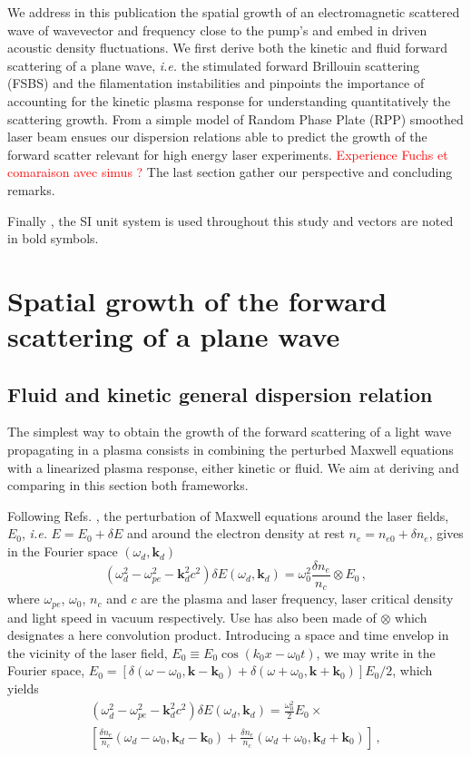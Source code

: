 \documentclass[
 reprint,
 amsmath,amssymb,
 aps,
]{revtex4-1}
\begin{document}
We address in this publication  the spatial growth of an electromagnetic scattered wave of wavevector and frequency close to the pump's and embed in driven acoustic density fluctuations.
We first derive both the kinetic and fluid forward scattering of a plane wave, \emph{i.e.} the  stimulated forward Brillouin scattering (FSBS) and the filamentation instabilities and pinpoints the importance of accounting for the kinetic plasma response for understanding quantitatively the scattering growth.
From  a simple model of Random Phase Plate (RPP) smoothed laser beam ensues our dispersion relations  able to predict the growth of the forward scatter relevant for high energy laser experiments. 
\textcolor{red}{Experience Fuchs et comaraison avec simus ?} 
The last section gather our perspective and concluding remarks. 

Finally , the SI unit system is used throughout this study and vectors are noted in bold symbols. 

\section{Spatial growth of the  forward scattering of a plane wave}\label{sec:plane}
\subsection{Fluid and kinetic general dispersion relation}
The simplest way to obtain the growth of the forward scattering of a light wave propagating in a plasma consists  in combining the perturbed Maxwell equations with a linearized plasma response, either kinetic or fluid.
We aim at deriving and comparing in this section both frameworks.

Following Refs. \cite[]{Kruer,phd_Michel}, the perturbation of Maxwell equations around the laser fields, $E_0$, \emph{i.e.} $E = E_0 + \delta E$ and around the  electron density at rest $n_e = n_{e0}+\delta n_e$, gives in the Fourier space $(\omega_d,\mathbf{k}_d)$
\begin{equation}
    (\omega_d^2 - \omega_{pe}^2 -\mathbf{k}_d^2c^2)\delta E(\omega_d,\mathbf{k}_d) = \omega_0^2 \frac{\delta n_e }{n_c}\otimes E_0  \, ,\label{eq:max1}
\end{equation}
where $\omega_{pe}$, $\omega_{0}$,  $n_c$ and $c$ are the plasma and laser frequency, laser critical density and light speed in vacuum respectively. Use has also been made of $\otimes$ which designates a here convolution product.
Introducing a space and time envelop in the vicinity of the laser field, $E_0\equiv E_0 \cos(k_0 x - \omega_0t)$,
we may write in the Fourier space,  $E_0 =[ \delta(\omega-\omega_0, \mathbf{k}-\mathbf{k}_0) + \delta(\omega+\omega_0, \mathbf{k}+\mathbf{k}_0) ]E_0/2 $, which yields 
\begin{align}
    (\omega_d^2 - \omega_{pe}^2 -\mathbf{k}_d^2c^2)\delta E(\omega_d,\mathbf{k}_d) = \frac{\omega_0^2}{2} E_0\times \nonumber\\ \left[\frac{\delta n_e }{n_c}(\omega_d-\omega_0, \mathbf{k}_d-\mathbf{k}_0) +\frac{\delta n_e }{n_c}(\omega_d+\omega_0, \mathbf{k}_d+\mathbf{k}_0) \right] \, ,\label{eq:max2}
\end{align}
\end{document}
